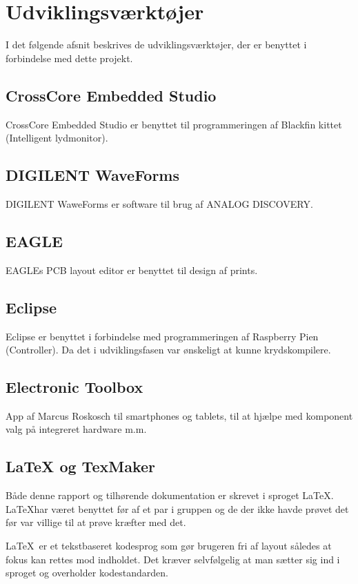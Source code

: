 \chapter{Udviklingsværktøjer}
I det følgende afsnit beskrives de udviklingsværktøjer, der er benyttet i forbindelse med dette projekt. 

\section*{CrossCore Embedded Studio}
CrossCore Embedded Studio er benyttet til programmeringen af Blackfin kittet (Intelligent lydmonitor).

\section*{DIGILENT WaveForms}
DIGILENT WaweForms er software til brug af ANALOG DISCOVERY.

\section*{EAGLE}
EAGLEs PCB layout editor er benyttet til design af prints.

\section*{Eclipse}
Eclipse er benyttet i forbindelse med programmeringen af Raspberry Pien (Controller). Da det i udviklingsfasen var ønskeligt at kunne krydskompilere. 

\section*{Electronic Toolbox}
App af Marcus Roskosch til smartphones og tablets, til at hjælpe med komponent valg på integreret hardware m.m.

\section*{LaTeX og TexMaker}
Både denne rapport og tilhørende dokumentation er skrevet i sproget \LaTeX. \LaTeX har været benyttet før af et par i gruppen og de der ikke havde prøvet det før var villige til at prøve kræfter med det.

\LaTeX \ er et tekstbaseret kodesprog som gør brugeren fri af layout således at fokus kan rettes mod indholdet. Det kræver selvfølgelig at man sætter sig ind i sproget og overholder kodestandarden. 


